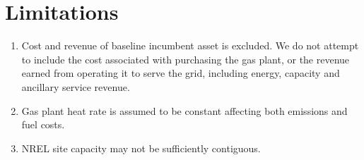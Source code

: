 \documentclass[9pt, oneside]{article}
\numberwithin{equation}{subsubsection}
\begin{document}
%
%

\section{Limitations}
\begin{enumerate}
	\item Cost and revenue of baseline incumbent asset is excluded.
	      We do not attempt to include the cost associated with purchasing the gas plant, or the revenue earned from operating it to serve the grid, including energy, capacity and ancillary service revenue.
	\item Gas plant heat rate is assumed to be constant affecting both emissions and fuel costs.
	\item NREL site capacity may not be sufficiently contiguous.
\end{enumerate}
\end{document}
